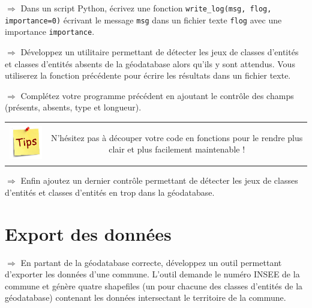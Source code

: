 \documentclass[11pt]{article}
\newcommand{\action}{$\Rightarrow$ }
\newenvironment{note}{%
	\begin{tabular}[t t]{c c}
		\includegraphics{img/tips.png}
		 &
		\begin{minipage}[c]{0.9\linewidth}
			\begin{sffamily}
}{%
			\end{sffamily}
		\end{minipage}
	\end{tabular}
}
\newcommand{\code}[1]{\lstinline{#1}}
\begin{document}
\action Dans un script Python, écrivez une fonction \code{write_log(msg, flog, importance=0)} écrivant le message \code{msg} dans un fichier texte \code{flog} avec une importance \code{importance}.

\action Développez un utilitaire permettant de détecter les jeux de classes d'entités et classes d'entités absents de la géodatabase alors qu'ils y sont attendus. Vous utiliserez la fonction précédente pour écrire les résultats dans un fichier texte.

\action Complétez votre programme précédent en ajoutant le contrôle des champs (présents, absents, type et longueur).

\begin{note}
N'hésitez pas à découper votre code en fonctions pour le rendre plus clair et plus facilement maintenable !
\end{note}

\action Enfin ajoutez un dernier contrôle permettant de détecter les jeux de classes d'entités et classes d'entités en trop dans la géodatabase.



\section{Export des données}

\action En partant de la géodatabase correcte, développez un outil permettant d'exporter les données d'une commune. L'outil demande le numéro INSEE de la commune et génère quatre shapefiles (un pour chacune des classes d'entités de la géodatabase) contenant les données intersectant le territoire de la commune.
\end{document}
